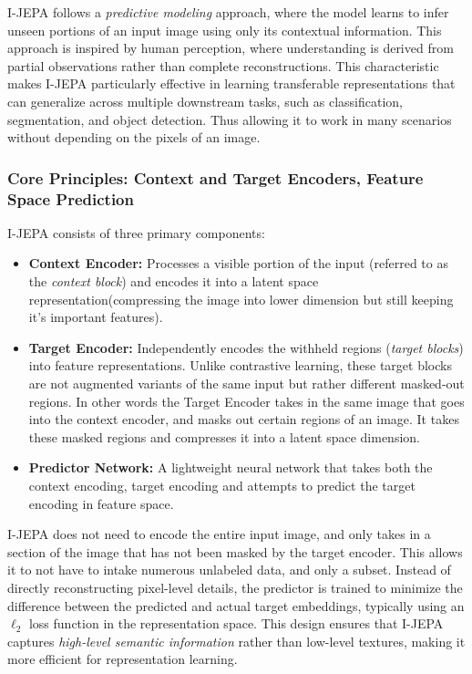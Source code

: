 \documentclass{article}
\begin{document}
I-JEPA follows a \textit{predictive modeling} approach, where the model learns to infer unseen portions of an input image using only its contextual information. This approach is inspired by human perception, where understanding is derived from partial observations rather than complete reconstructions. This characteristic makes I-JEPA particularly effective in learning transferable representations that can generalize across multiple downstream tasks, such as classification, segmentation, and object detection. Thus allowing it to work in many scenarios without depending on the pixels of an image. 

\subsubsection{Core Principles: Context and Target Encoders, Feature Space Prediction}
I-JEPA consists of three primary components:
\begin{itemize}
    \item \textbf{Context Encoder:} Processes a visible portion of the input (referred to as the \textit{context block}) and encodes it into a latent space representation(compressing the image into lower dimension but still keeping it's important features).
    \item \textbf{Target Encoder:} Independently encodes the withheld regions (\textit{target blocks}) into feature representations. Unlike contrastive learning, these target blocks are not augmented variants of the same input but rather different masked-out regions. In other words the Target Encoder takes in the same image that goes into the context encoder, and masks out certain regions of an image. It takes these masked regions and compresses it into a latent space dimension. 
    \item \textbf{Predictor Network:} A lightweight neural network that takes both the context encoding, target encoding and attempts to predict the target encoding in feature space. 
\end{itemize}

I-JEPA does not need to encode the entire input image, and only takes in a section of the image that has not been masked by the target encoder. This allows it to not have to intake numerous unlabeled data, and only a subset. Instead of directly reconstructing pixel-level details, the predictor is trained to minimize the difference between the predicted and actual target embeddings, typically using an $\ell_2$ loss function in the representation space. This design ensures that I-JEPA captures \textit{high-level semantic information} rather than low-level textures, making it more efficient for representation learning.
\end{document}
